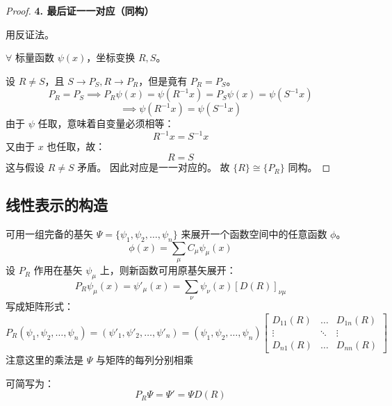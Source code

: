 \begin{proof}
    \textbf{4. 最后证一一对应（同构）}

    用反证法。

    $\forall$ 标量函数 $\psi(x)$，坐标变换 $R, S$。

    设 $R \neq S$，且 $S \to P_S, R \to P_R$，但是竟有 $P_R = P_S$。
    \begin{equation}
        P_R = P_S \implies P_R \psi(x) = \psi(R^{-1}x) = P_S \psi(x) = \psi(S^{-1}x)
    \end{equation}
    \begin{equation}
        \implies \psi(R^{-1}x) = \psi(S^{-1}x)
    \end{equation}
    由于 $\psi$ 任取，意味着自变量必须相等：
    \begin{equation}
        R^{-1}x = S^{-1}x
    \end{equation}
    又由于 $x$ 也任取，故：
    \begin{equation}
        R = S
    \end{equation}
    这与假设 $R \neq S$ 矛盾。
    因此对应是一一对应的。
    故 $\{R\} \cong \{P_R\}$ 同构。
\end{proof}

\subsection{线性表示的构造}
可用一组完备的基矢 $\Psi = \{\psi_1, \psi_2, \dots, \psi_n\}$ 来展开一个函数空间中的任意函数 $\phi$。
\begin{equation}
    \phi(x) = \sum_\mu C_\mu \psi_\mu(x)
\end{equation}
设 $P_R$ 作用在基矢 $\psi_\mu$ 上，则新函数可用原基矢展开：
\begin{equation}
    P_R \psi_\mu(x) = \psi'_\mu(x) = \sum_\nu \psi_\nu(x) [D(R)]_{\nu\mu}
\end{equation}
写成矩阵形式：
\begin{equation}
    P_R (\psi_1, \psi_2, \dots, \psi_n) = (\psi'_1, \psi'_2, \dots, \psi'_n) = (\psi_1, \psi_2, \dots, \psi_n) 
    \begin{bmatrix} 
        D_{11}(R) & \dots & D_{1n}(R) \\
        \vdots & \ddots & \vdots \\
        D_{n1}(R) & \dots & D_{nn}(R)
    \end{bmatrix}
\end{equation}
注意这里的乘法是 $\Psi$ 与矩阵的每列分别相乘

可简写为：
\begin{equation}
    P_R \Psi = \Psi' = \Psi D(R)
\end{equation}

